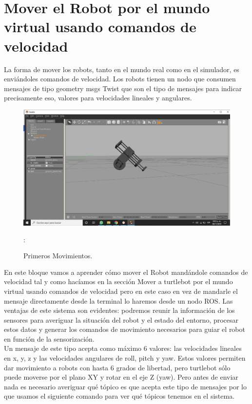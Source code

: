 \documentclass[11pt,a4paper,oldfontcommands,oneside]{memoir}
\begin{document}
\chapter{Mover el Robot por el mundo virtual usando comandos de velocidad}
La forma de mover los robots, tanto en el mundo real como en el simulador, es enviándoles comandos de velocidad. Los robots tienen un nodo que consumen mensajes de tipo geometry msgs Twist que son el tipo de mensajes para indicar precisamente eso, valores para velocidades lineales y angulares.\\

\begin{figure}
\begin{center}
\includegraphics[scale=.30]{106.jpeg}
\end{center}
\caption{Primeros Movimientos.}
\label{blender}:
\end{figure}
En este bloque vamos a aprender cómo mover el Robot mandándole comandos de velocidad tal y como hacíamos en la sección Mover a turtlebot por el mundo virtual usando comandos de velocidad pero en este caso en vez de mandarle el mensaje directamente desde la terminal lo haremos desde un nodo ROS. Las ventajas de este sistema son evidentes: podremos reunir la información de los sensores para averiguar la situación del robot y el estado del entorno, procesar estos datos y generar los comandos de movimiento necesarios para guiar el robot en función de la sensorización.\\


Un mensaje de este tipo acepta como máximo 6 valores: las velocidades lineales en x, y, z y las velocidades angulares de roll, pitch y yaw. Estos valores permiten dar movimiento a robots con hasta 6 grados de libertad, pero turtlebot sólo puede moverse por el plano XY y rotar en el eje Z (yaw).
Pero antes de enviar nada es necesario averiguar qué tópico es que acepta este tipo de mensajes por lo que usamos el siguiente comando para ver qué tópicos tenemos en el sistema.
\end{document}
